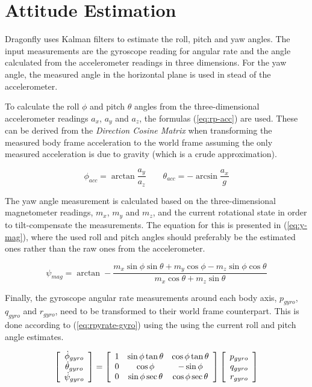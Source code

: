 \documentclass[a4paper]{report}
\begin{document}
	\section{Attitude Estimation}
Dragonfly uses Kalman filters to estimate the roll, pitch and yaw angles. The input measurements are the gyroscope reading for angular rate and the angle calculated from the accelerometer readings in three dimensions. For the yaw angle, the measured angle in the horizontal plane is used in stead of the accelerometer.

To calculate the roll $\phi$ and pitch $\theta$ angles from the three-dimensional accelerometer readings $a_x$, $a_y$ and $a_z$, the formulas (\ref{eq:rp-acc}) are used. These can be derived from the \emph{Direction Cosine Matrix} when transforming the measured body frame acceleration to the world frame assuming the only measured acceleration is due to gravity (which is a crude approximation).

\begin{equation}
\label{eq:rp-acc}
\phi_{acc} = \arctan \dfrac{a_y}{a_z} \qquad \theta_{acc} = -\arcsin \dfrac{a_x}{g}
\end{equation}

The yaw angle measurement is calculated based on the three-dimensional magnetometer readings, $m_x$, $m_y$ and $m_z$, and the current rotational state in order to tilt-compensate the measurements. The equation for this is presented in (\ref{eq:y-mag}), where the used roll and pitch angles should preferably be the estimated ones rather than the raw ones from the accelerometer.

\begin{equation}
\label{eq:y-mag}
\psi_{mag} = \arctan - \dfrac{m_x \sin \phi \sin \theta + m_y \cos \phi - m_z \sin \phi \cos \theta}{m_x \cos \theta + m_z \sin \theta}
\end{equation}

Finally, the gyroscope angular rate measurements around each body axis, $p_{gyro}$, $q_{gyro}$ and $r_{gyro}$, need to be transformed to their world frame counterpart. This is done according to (\ref{eq:rpyrate-gyro}) using the using the current roll and pitch angle estimates.

\begin{equation}
\label{eq:rpyrate-gyro}
\left[
\begin{array}{c}
\dot{\phi}_{gyro}\\
\dot{\theta}_{gyro}\\
\dot{\psi}_{gyro}
\end{array} \right]
=
\left[
		\begin{array}{c c c}
		1 &   \sin \phi \tan \theta & \cos \phi \tan \theta \\
		0 & \cos \phi & - \sin \phi \\
		0 & \sin \phi \sec \theta & \cos \phi \sec \theta \\
\end{array} \right]
\left[
\begin{array}{c}
p_{gyro}\\
q_{gyro}\\
r_{gyro}
\end{array} \right]
\end{equation}
\end{document}
